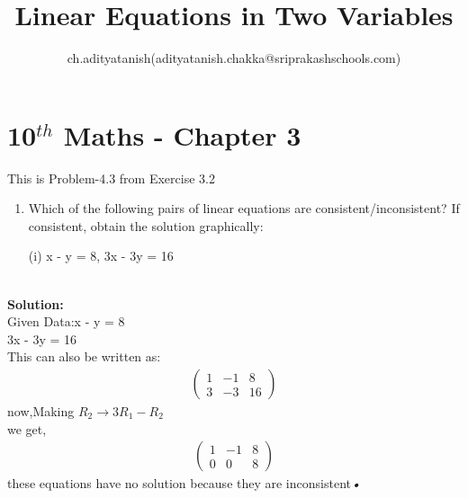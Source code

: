 \documentclass[12pt]{article}
\title{Linear Equations in Two Variables}
\author{ch.adityatanish(adityatanish.chakka@sriprakashschools.com)}
\newcommand{\myvec}[1]{\ensuremath{\begin{pmatrix}#1\end{pmatrix}}}
\newcommand{\solution}{\noindent \textbf{Solution: }}
\begin{document}
\maketitle
\section*{10$^{th}$ Maths - Chapter 3}
This is Problem-4.3 from Exercise 3.2
\begin{enumerate}
\item  Which of the following pairs of linear equations are consistent/inconsistent? If consistent, obtain the solution graphically:

(i) x - y = 8, 3x - 3y = 16 \\\\
\end{enumerate}
\solution \\
Given Data:x - y = 8\\ 
           3x - 3y = 16\\

This can also be written as:
\begin{align}
\myvec{1&-1&8\\3&-3&16}
\end{align}
now,Making $R_2 \xrightarrow\ 3R_1 - R_2$\\ 
we get,
\begin{align}
\myvec{1&-1&8\\0&0&8}
\end{align}
these equations have no solution because they are inconsistent\textsl{•}
\end{document}
